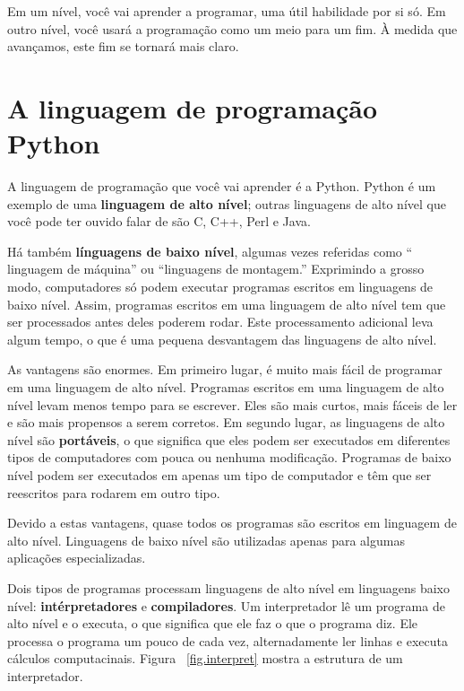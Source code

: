 \documentclass[10pt]{book}
\begin{document}
Em um nível, você vai aprender a programar, uma útil
habilidade por si só. Em outro nível, você usará a programação como um meio para
um fim. À medida que avançamos, este fim se tornará mais claro.

\section{A linguagem de programação Python}

A linguagem de programação que você vai aprender é a Python. Python é
um exemplo de uma {\bf linguagem de alto nível}; outras linguagens de alto nível
que você pode ter ouvido falar de são C, C++, Perl e Java.

Há
também {\bf línguagens de baixo nível}, algumas vezes referidas como `` linguagem de
máquina'' ou ``linguagens de montagem.'' Exprimindo a grosso modo, computadores
só podem executar programas escritos em linguagens de baixo nível. Assim,
programas escritos em uma linguagem de alto nível tem que ser processados ​​antes
deles poderem rodar. Este processamento adicional leva algum tempo, o que é uma pequena
desvantagem das linguagens de alto nível.

As vantagens são enormes. Em primeiro lugar, é muito mais fácil de programar
em uma linguagem de alto nível. Programas escritos em uma linguagem de alto nível
levam menos tempo para se escrever. Eles são mais curtos, mais fáceis de ler e
são mais propensos a serem corretos. Em segundo lugar, as linguagens de alto nível são {\bf
portáveis}, o que significa que eles podem ser executados em diferentes tipos de computadores
com pouca ou nenhuma modificação. Programas de baixo nível podem ser executados em apenas um
tipo de computador e têm que ser reescritos para rodarem em outro tipo.

Devido a estas vantagens, quase todos os programas são escritos em linguagem de alto
nível. Linguagens de baixo nível são utilizadas apenas para algumas aplicações
especializadas.

Dois tipos de programas processam linguagens de alto nível em linguagens baixo
nível: {\bf intérpretadores} e {\bf compiladores}. Um interpretador
lê um programa de alto nível e o executa, o que significa que ele faz o que
o programa diz. Ele processa o programa um pouco de cada vez,
alternadamente ler linhas e executa cálculos computacinais.
Figura~ \ref{fig.interpret} mostra a estrutura de um interpretador.
\end{document}
